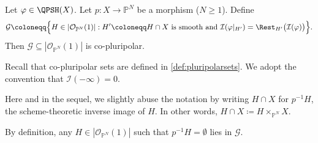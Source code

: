 \begin{theorem}\label{thm:Bert}
Let $\varphi\in \QPSH(X)$. Let $p\colon X\rightarrow \mathbb{P}^N$ be a morphism ($N\geq 1$). Define
\[
\mathcal{G}\coloneqq \Bigl\{H\in |\mathcal{O}_{\mathbb{P}^N}(1)|: H'\coloneqq H\cap X \textup{ is smooth and } \mathcal{I}(\varphi|_{H'})=\Rest_{H'}\bigl(\mathcal{I}(\varphi)\bigr)\Bigr\}.
\]
Then $\mathcal{G}\subseteq |\mathcal{O}_{\mathbb{P}^N}(1)|$ is co-pluripolar.
\end{theorem}
Recall that co-pluripolar sets are defined in \cref{def:pluripolarsets}. We adopt the convention that $\mathcal{I}(-\infty)=0$.
\begin{remark}\label{rmk:trace:L787}
Here and in the sequel, we slightly abuse the notation by writing $H\cap X$ for $p^{-1}H$, the scheme-theoretic inverse image of $H$. In other words, $H\cap X\coloneqq H\times_{\mathbb{P}^N} X$.

By definition, any $H\in |\mathcal{O}_{\mathbb{P}^N}(1)|$ such that $p^{-1}H=\emptyset$ lies in $\mathcal{G}$.
\end{remark}
